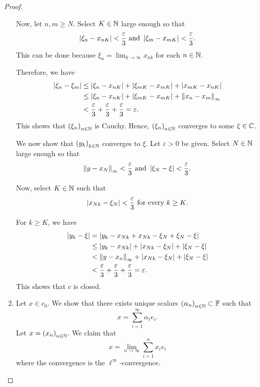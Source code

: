 \begin{proof}
\begin{enumerate}[label=(\alph*)]
	    Now, let $n,m \ge N$. Select $K \in \mathbb N$ large enough so that
	    \begin{align*}
		\left\lvert \xi_{n} - x_{nK} \right\rvert < \frac{\varepsilon}{3} \text{ and } \left\lvert \xi_{m} - x_{mK} \right\rvert < \frac{\varepsilon}{3} \text{.}
	    \end{align*}
	    This can be done because $\xi_{n} = \lim_{k \to \infty} x_{nk}$ for each $n\in \mathbb N$.

	    Therefore, we have 
\begin{align*}
    \left\lvert \xi_{n}-\xi_{m} \right\rvert &\le \left\lvert \xi_{n} - x_{nK} \right\rvert + \left\lvert \xi_{mK} - x_{mK} \right\rvert + \left\lvert x_{mK} - x_{nK} \right\rvert \\
    &\le \left\lvert \xi_{n} - x_{nK} \right\rvert + \left\lvert \xi_{mK} - x_{mK} \right\rvert + \left\lVert x_{n} -x_{m} \right\rVert_{\infty} \\
    &< \frac{\varepsilon}{3} + \frac{\varepsilon}{3} + \frac{\varepsilon}{3} = \varepsilon.
\end{align*}
This shows that $\left( \xi_{n} \right)_{n\in \mathbb N}$ is Cauchy.
Hence, $\left( \xi_{n} \right)_{n\in \mathbb N}$ converges to some $\xi \in \mathbb C$.

    We now show that $\left( y_{k} \right)_{k\in \mathbb N}$ converges to $\xi$. Let $\varepsilon > 0$ be given. Select $N\in \mathbb N$ large enough so that
    \begin{equation*}
	\left\lVert y-x_{N} \right\rVert_{\infty} < \frac{\varepsilon}{3} \text{ and } \left\lvert \xi_{N} - \xi \right\rvert < \frac{\varepsilon}{3}.
    \end{equation*}

    Now, select $K \in \mathbb N$ such that 
    \begin{equation*}
	\left\lvert x_{Nk} - \xi_{N} \right\rvert < \frac{\varepsilon}{3} \text{ for every } k \ge K.
    \end{equation*}

    For $k\ge K$, we have 
    \begin{align*}
	\left\lvert y_{k} - \xi \right\rvert &= \left\lvert y_{k} - x_{Nk} + x_{Nk} - \xi_{N} + \xi_{N} - \xi \right\rvert \\
&\le \left\lvert y_{k} - x_{Nk} \right\rvert + \left\lvert x_{Nk} - \xi_{N} \right\rvert + \left\lvert \xi_{N} - \xi \right\rvert \\
&< \left\lVert y-x_{n} \right\rVert_{\infty} +  \left\lvert x_{Nk} - \xi_{N} \right\rvert + \left\lvert \xi_{N} - \xi \right\rvert \\
&< \frac{\varepsilon}{3} + \frac{\varepsilon}{3} + \frac{\varepsilon}{3}
= \varepsilon.
    \end{align*}
    This shows that $c$ is closed.
\item Let $x\in c_{0}$. We show that there exists unique scalars $\left( \alpha_{n} \right)_{n\in \mathbb N} \subset \mathbb F$ such that
    \begin{equation*}
	x= \sum_{i=1}^{\infty} \alpha_{i} e_{i}.
    \end{equation*}
    Let $x=\left( x_{n} \right)_{n \in \mathbb N}$. We claim that
    \begin{equation*}
	x= \lim_{n\to \infty} \sum_{i=1}^{n} x_{i}e_{i}
    \end{equation*}
    where the convergence is the $\ell ^{\infty}$-convergence.


\end{enumerate}
\end{proof}
